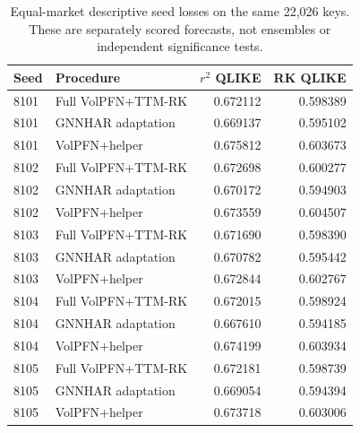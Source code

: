 \begin{table}[!htbp]\centering
\begingroup\small\setlength{\tabcolsep}{4pt}
\caption[Common-period reference seeds]{Equal-market descriptive seed losses on the same 22,026 keys. These are separately scored forecasts, not ensembles or independent significance tests.}\label{tab:new-common-seeds}
\begin{tabular}{@{}l>{\raggedright\arraybackslash}p{6cm}rr@{}}
\toprule
Seed & Procedure & $r^2$ QLIKE & RK QLIKE \\
\midrule
8101 & Full VolPFN+TTM-RK & 0.672112 & 0.598389 \\
8101 & GNNHAR adaptation & 0.669137 & 0.595102 \\
8101 & VolPFN+helper & 0.675812 & 0.603673 \\
8102 & Full VolPFN+TTM-RK & 0.672698 & 0.600277 \\
8102 & GNNHAR adaptation & 0.670172 & 0.594903 \\
8102 & VolPFN+helper & 0.673559 & 0.604507 \\
8103 & Full VolPFN+TTM-RK & 0.671690 & 0.598390 \\
8103 & GNNHAR adaptation & 0.670782 & 0.595442 \\
8103 & VolPFN+helper & 0.672844 & 0.602767 \\
8104 & Full VolPFN+TTM-RK & 0.672015 & 0.598924 \\
8104 & GNNHAR adaptation & 0.667610 & 0.594185 \\
8104 & VolPFN+helper & 0.674199 & 0.603934 \\
8105 & Full VolPFN+TTM-RK & 0.672181 & 0.598739 \\
8105 & GNNHAR adaptation & 0.669054 & 0.594394 \\
8105 & VolPFN+helper & 0.673718 & 0.603006 \\
\bottomrule
\end{tabular}\endgroup\end{table}
